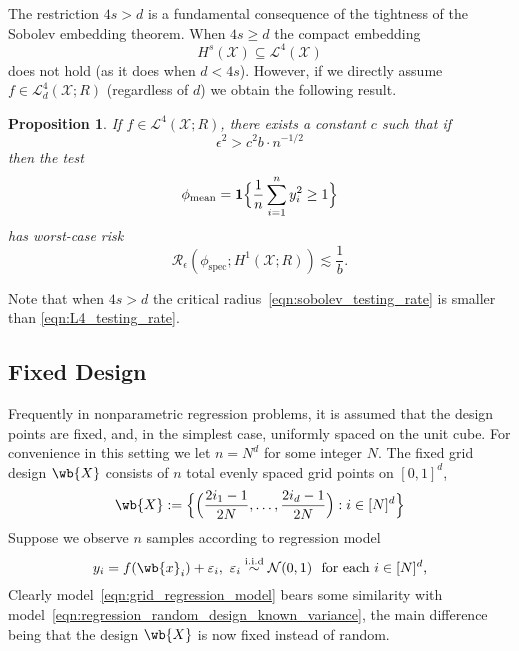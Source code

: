 \documentclass{article}
\newcommand{\1}{\mathbf{1}}
\newcommand{\Leb}{\mathcal{L}}
\theoremstyle{alden}
\theoremstyle{aldenthm}
\newtheorem{proposition}{Proposition}
\theoremstyle{definition}
\theoremstyle{remark}
\begin{document}
The restriction $4s > d$ is a fundamental consequence of the tightness of the Sobolev embedding theorem. When $4s \geq d$ the compact embedding
\begin{equation*}
H^{s}(\mathcal{X}) \subseteq \Leb^4(\mathcal{X}) 
\end{equation*}
does not hold (as it does when $d < 4s$). However, if we directly assume $f \in \mathcal{L}_d^4(\mathcal{X};R)$ (regardless of $d$) we obtain the following result.
\begin{proposition}
	\label{prop:L4_testing_rate}
	If $f \in \Leb^4(\mathcal{X};R)$, there exists a constant $c$ such that if
	\begin{equation}
	\label{eqn:L4_testing_rate}
	\epsilon^2 > c^2 b \cdot n^{-1/2}
	\end{equation}
	then the test
	\begin{equation*}
	\phi_{\mathrm{mean}} = \1\Bigl\{\frac{1}{n}\sum_{i = 1}^{n} y_i^2 \geq 1\Bigr\}
	\end{equation*}
	has worst-case risk
	\begin{equation*}
	\mathcal{R}_{\epsilon}(\phi_{\mathrm{spec}}; H^1(\mathcal{X};R)) \lesssim \frac{1}{b}. 
	\end{equation*}
\end{proposition}
Note that when $4s > d$ the critical radius~\eqref{eqn:sobolev_testing_rate} is smaller than \eqref{eqn:L4_testing_rate}. 

\subsection{Fixed Design}
Frequently in nonparametric regression problems, it is assumed that the design points are fixed, and, in the simplest case, uniformly spaced on the unit cube. For convenience in this setting we let $n = N^d$ for some integer $N$. The fixed grid design $\wb{X}$ consists of $n$ total evenly spaced grid points on $[0,1]^d$,
\begin{equation*}
\wb{X} := \Bigl\{\Bigl(\frac{2i_1 - 1}{2N},\ldots,\frac{2i_d - 1}{2N}\Bigr): i \in [N]^d\Bigr\}
\end{equation*}
Suppose we observe $n$ samples according to regression model
\begin{equation}
\label{eqn:grid_regression_model}
y_i = f(\wb{x}_i) + \varepsilon_i, ~\varepsilon_i \overset{\mathrm{i.i.d}}{\sim} \mathcal{N}(0,1) ~~\textrm{for each $i \in [N]^d$,}
\end{equation}
Clearly model~\eqref{eqn:grid_regression_model} bears some similarity with model~\eqref{eqn:regression_random_design_known_variance}, the main difference being that the design $\wb{X}$ is now fixed instead of random. 
\end{document}
